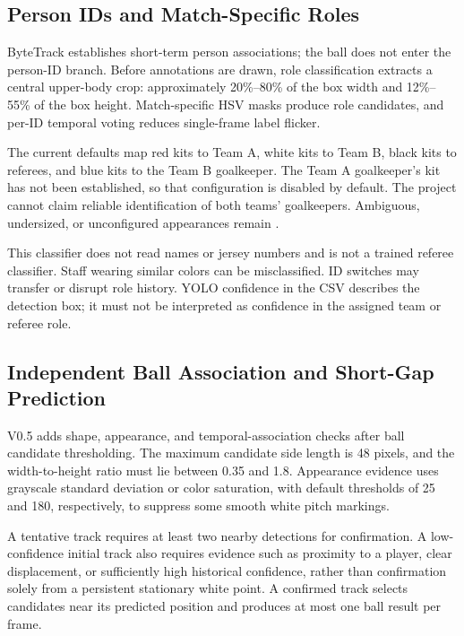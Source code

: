 \documentclass[11pt,a4paper]{article}
\newcommand{\code}[1]{\texttt{\detokenize{#1}}}
\begin{document}
\subsection{Person IDs and Match-Specific Roles}

ByteTrack establishes short-term person associations; the ball does not enter
the person-ID branch. Before annotations are drawn, role classification
extracts a central upper-body crop: approximately 20\%--80\% of the box width
and 12\%--55\% of the box height. Match-specific HSV masks produce role candidates,
and per-ID temporal voting reduces single-frame label flicker.

The current defaults map red kits to Team A, white kits to Team B, black kits
to referees, and blue kits to the Team B goalkeeper. The Team A goalkeeper's
kit has not been established, so that configuration is disabled by default.
The project cannot claim reliable identification of both teams' goalkeepers.
Ambiguous, undersized, or unconfigured appearances remain \code{unknown}.

This classifier does not read names or jersey numbers and is not a trained
referee classifier. Staff wearing similar colors can be misclassified.
ID switches may transfer or disrupt role history. YOLO confidence in the CSV
describes the detection box; it must not be interpreted as confidence in the
assigned team or referee role.

\subsection{Independent Ball Association and Short-Gap Prediction}

V0.5 adds shape, appearance, and temporal-association checks after ball
candidate thresholding. The maximum candidate side length is 48 pixels,
and the width-to-height ratio must lie between 0.35 and 1.8.
Appearance evidence uses grayscale standard deviation or color saturation,
with default thresholds of 25 and 180, respectively, to suppress some smooth
white pitch markings.

A tentative track requires at least two nearby detections for confirmation.
A low-confidence initial track also requires evidence such as proximity to
a player, clear displacement, or sufficiently high historical confidence,
rather than confirmation solely from a persistent stationary white point.
A confirmed track selects candidates near its predicted position and produces
at most one ball result per frame.
\end{document}
